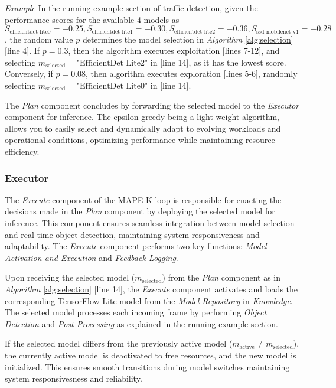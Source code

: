 \noindent
\textit{Example} In the running example section of traffic detection, given the performance scores for the available 4 models as \(S_\text{efficientdet-lite0} = -0.25, S_\text{efficientdet-lite1} = -0.30, S_\text{efficientdet-lite2} = -0.36, S_\text{ssd-mobilenet-v1} = -0.28\), the random value \(p\) determines the model selection in \textit{Algorithm} \ref{alg:selection}[line 4]. If \(p = 0.3\), then the algorithm executes exploitation [lines 7-12], and selecting \(m_\text{selected} = \text{"EfficientDet Lite2"}\) in [line 14], as it has the lowest score. Conversely, if \(p = 0.08\), then algorithm executes exploration [lines 5-6], randomly selecting \(m_\text{selected} = \text{"EfficientDet Lite0"}\) in [line 14]. 


The \textit{Plan} component concludes by forwarding the selected model to the \textit{Executor} component for inference. The epsilon-greedy being a light-weight algorithm, allows you to easily select and dynamically adapt to evolving workloads and operational conditions, optimizing performance while maintaining resource efficiency. 

\subsubsection{\textbf{Executor}}

The \textit{Execute} component of the MAPE-K loop is responsible for enacting the decisions made in the \textit{Plan} component by deploying the selected model for inference. This component ensures seamless integration between model selection and real-time object detection, maintaining system responsiveness and adaptability. The \textit{Execute} component performs two key functions: \textit{Model Activation and Execution} and \textit{Feedback Logging}.

Upon receiving the selected model (\(m_\text{selected}\)) from the \textit{Plan} component as in \textit{Algorithm} \ref{alg:selection} [line 14], the \textit{Execute} component activates and loads the corresponding TensorFlow Lite model from the \textit{Model Repository} in \textit{Knowledge}. The selected model processes each incoming frame by performing \textit{Object Detection} and \textit{Post-Processing} as explained in the running example section. 

If the selected model differs from the previously active model (\(m_\text{active} \neq m_\text{selected}\)), the currently active model is deactivated to free resources, and the new model is initialized. This ensures smooth transitions during model switches maintaining system responsivesness and reliability. 

